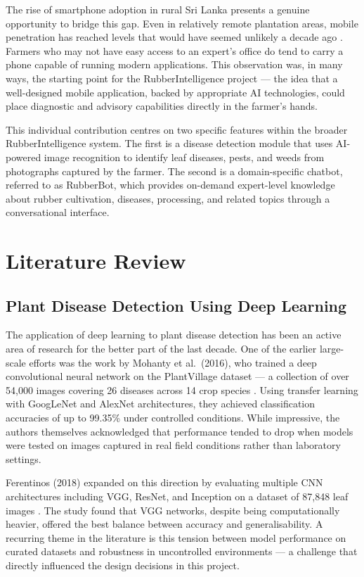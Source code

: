 The rise of smartphone adoption in rural Sri Lanka presents a genuine opportunity to bridge this gap. Even in relatively remote plantation areas, mobile penetration has reached levels that would have seemed unlikely a decade ago \cite{ref6}. Farmers who may not have easy access to an expert's office do tend to carry a phone capable of running modern applications. This observation was, in many ways, the starting point for the RubberIntelligence project --- the idea that a well-designed mobile application, backed by appropriate AI technologies, could place diagnostic and advisory capabilities directly in the farmer's hands.

This individual contribution centres on two specific features within the broader RubberIntelligence system. The first is a disease detection module that uses AI-powered image recognition to identify leaf diseases, pests, and weeds from photographs captured by the farmer. The second is a domain-specific chatbot, referred to as RubberBot, which provides on-demand expert-level knowledge about rubber cultivation, diseases, processing, and related topics through a conversational interface.


\section{Literature Review}

\subsection{Plant Disease Detection Using Deep Learning}

The application of deep learning to plant disease detection has been an active area of research for the better part of the last decade. One of the earlier large-scale efforts was the work by Mohanty et al.\ (2016), who trained a deep convolutional neural network on the PlantVillage dataset --- a collection of over 54,000 images covering 26 diseases across 14 crop species \cite{ref7}. Using transfer learning with GoogLeNet and AlexNet architectures, they achieved classification accuracies of up to 99.35\% under controlled conditions. While impressive, the authors themselves acknowledged that performance tended to drop when models were tested on images captured in real field conditions rather than laboratory settings.

Ferentinos (2018) expanded on this direction by evaluating multiple CNN architectures including VGG, ResNet, and Inception on a dataset of 87,848 leaf images \cite{ref8}. The study found that VGG networks, despite being computationally heavier, offered the best balance between accuracy and generalisability. A recurring theme in the literature is this tension between model performance on curated datasets and robustness in uncontrolled environments --- a challenge that directly influenced the design decisions in this project.

